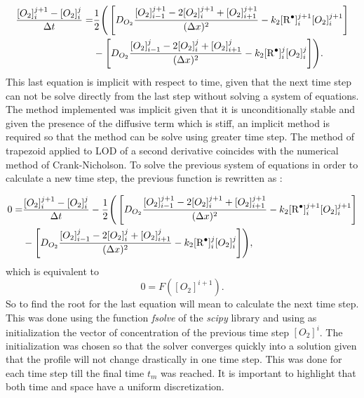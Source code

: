 \begin{refsection}
\begin{align}
    \frac{[O_2]^{j+1}_i-[O_2]^j_i}{\Delta t}=&\frac{1}{2}\Biggr(\left[ D_{O_2} \frac{[O_2]_{i-1}^{j+1}-2[O_2]_{i}^{j+1}+[O_2]_{i+1}^{j+1}}{(\Delta x)^2}-k_2[\ce{R^.}]_i^{j+1}[O_2]_i^{j+1}\right] \nonumber\\
    &-\left[D_{O_2}\frac{[O_2]_{i-1}^{j}-2[O_2]_{i}^{j}+[O_2]_{i+1}^{j}}{(\Delta x)^2}-k_2[\ce{R^.}]_i^{j}[O_2]_i^{j}\right]\Biggr).
\end{align}
This last equation is implicit with respect to time, given that the next time step can not be solve directly from the last step without solving a system of equations. The method implemented was implicit given that it is unconditionally stable and given the presence of the diffusive term which is stiff, an implicit method is required so that the method can be solve using greater time step.  The method of trapezoid applied to LOD of a second derivative coincides with the numerical method of Crank-Nicholson. To solve the previous system of equations in order to calculate a new time step, the previous function is rewritten as :

\begin{align}
    0=&\frac{[O_2]^{j+1}_i-[O_2]^j_i}{\Delta t}-\frac{1}{2}\Biggr(\left[ D_{O_2} \frac{[O_2]_{i-1}^{j+1}-2[O_2]_{i}^{j+1}+[O_2]_{i+1}^{j+1}}{(\Delta x)^2}-k_2[\ce{R^.}]_i^{j+1}[O_2]_i^{j+1}\right] \nonumber\\
    &-\left[D_{O_2}\frac{[O_2]_{i-1}^{j}-2[O_2]_{i}^{j}+[O_2]_{i+1}^{j}}{(\Delta x)^2}-k_2[\ce{R^.}]_i^{j}[O_2]_i^{j}\right]\Biggr),
\end{align}
which is equivalent to 
\begin{equation}
    0=F([O_2]^{i+1}). 
\end{equation}
So to find the root for the last equation  will mean to calculate the next time step. This was done using the function \textit{fsolve} of the \textit{scipy} library and using as initialization the vector of concentration of the previous time step $[O_2]^{i}$. The initialization was chosen so that the solver converges quickly into a solution given that  the profile will not change drastically in one time step. This was done for each time step till the final time $t_m$ was reached. It is important to highlight that both time and space have a uniform discretization. 


\end{refsection}

